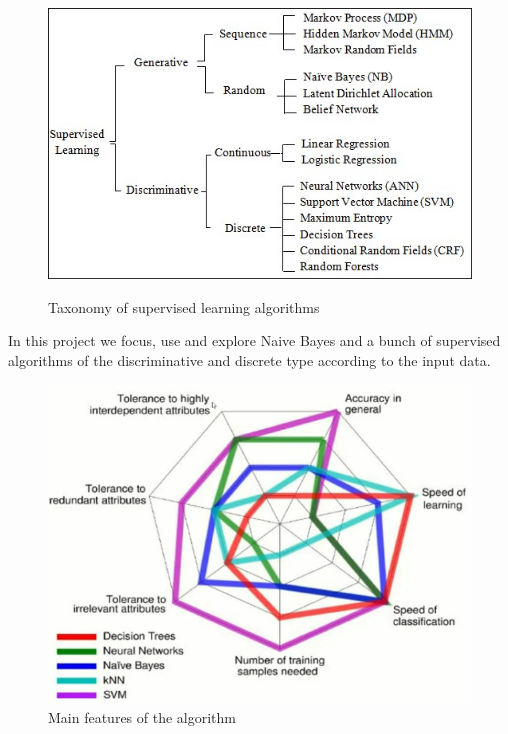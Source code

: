 \begin{figure}[ht] \centering \includegraphics[scale=0.8]{figures/Models representation.jpg}\citet{taxonomy} \caption{Taxonomy of supervised learning algorithms} \label{fig:overviewML} \end{figure}

In this project we focus, use and explore Naive Bayes and a bunch of supervised algorithms of the discriminative and discrete type according to the input data.
\espaco
\espaco
\espaco
\espaco
\espaco
\espaco
\espaco
\espaco
\espaco
\espaco
\espaco
\espaco
\espaco
\espaco
\espaco
\espaco
\espaco
\espaco
\espaco
\espaco
\espaco
\espaco
\espaco
\espaco
\espaco
\espaco
\espaco
\espaco
\espaco
\espaco
\espaco\espaco
\espaco
\espaco
\espaco
\espaco
\espaco
\espaco
\espaco
\espaco
\espaco
\espaco
\espaco
\espaco
\espaco

\espaco

\begin{figure}[ht] \centering \includegraphics[scale=0.6]{figures/SLalgorithmsCharateristics.png} \caption{Main features of the algorithm } \label{fig:overview} \end{figure}

